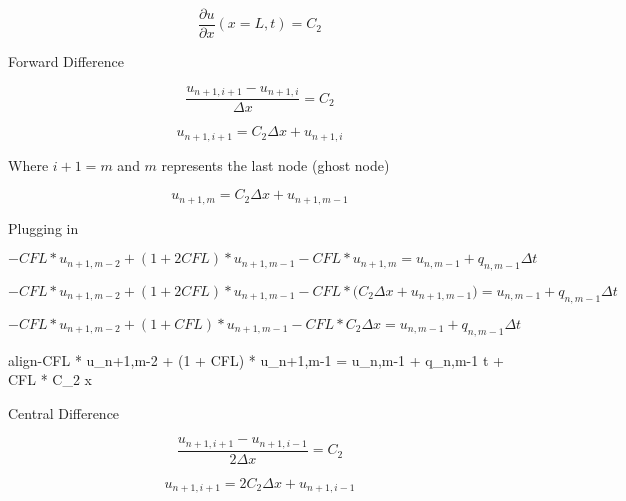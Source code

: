 \documentclass[10pt, letter, showtrims]{extarticle}
\newcommand{\boxedeq}[2]{\begin{empheq}[box={\fboxsep=6pt\fbox}]{align}\label{#1}#2\end{empheq}}
\begin{document}
		\begin{equation}
			\frac{\partial u}{\partial x}(x=L, t) = C_{2}
    		\end{equation}
    		
    		\noindent
    		Forward Difference
    		
    		\begin{equation}
    			\frac{u_{n+1,i+1} - u_{n+1,i}}{\Delta x} = C_{2}
    		\end{equation}
    		
    		\begin{equation}
    			u_{n+1,i+1} = C_{2} \Delta x + u_{n+1,i}
    		\end{equation}
    		
    		\noindent
    		Where $i+1 = m$ and $m$ represents the last node (ghost node)
    		
    		\begin{equation}
    			u_{n+1,m} = C_{2} \Delta x + u_{n+1,m-1}
    		\end{equation}
    		
    		\noindent
    		Plugging in
    		
    		\begin{equation}
    			-CFL * u_{n+1,m-2} + (1 + 2CFL) * u_{n+1,m-1} - CFL * u_{n+1,m} = u_{n,m-1} + q_{n,m-1} \Delta t
    		\end{equation}
    		
    		\begin{equation}
    			-CFL * u_{n+1,m-2} + (1 + 2CFL) * u_{n+1,m-1} - CFL * \big(C_{2} \Delta x + u_{n+1,m-1} \big) = u_{n,m-1} + q_{n,m-1} \Delta t
    		\end{equation}
    		
    		\begin{equation}
    			-CFL * u_{n+1,m-2} + (1 + CFL) * u_{n+1,m-1} - CFL * C_{2} \Delta x  = u_{n,m-1} + q_{n,m-1} \Delta t
    		\end{equation}
    		
    		\boxedeq{}{-CFL * u_{n+1,m-2} + (1 + CFL) * u_{n+1,m-1} = u_{n,m-1} + q_{n,m-1} \Delta t + CFL * C_{2} \Delta x}
    		
    		\noindent
    		Central Difference
    		
    		\begin{equation}
    			\frac{u_{n+1,i+1} - u_{n+1,i-1}}{2 \Delta x} = C_{2}
    		\end{equation}
    		
    		\begin{equation}
    			u_{n+1,i+1} = 2 C_{2} \Delta x + u_{n+1,i-1}
    		\end{equation}
    		
\end{document}
